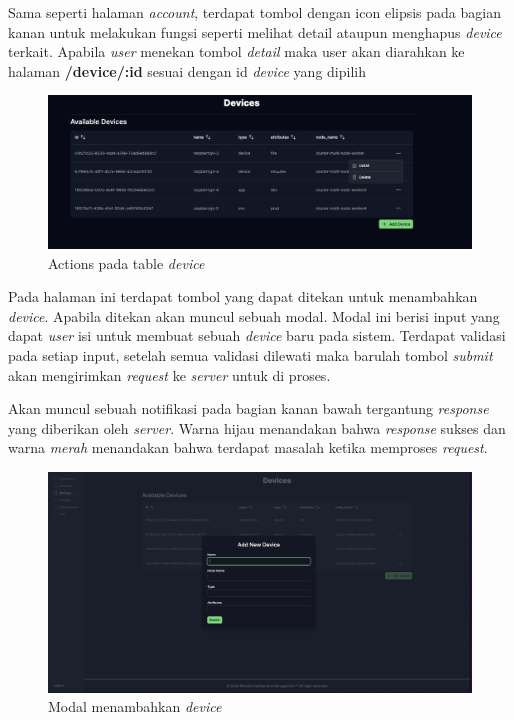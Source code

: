 Sama seperti halaman \textit{account}, terdapat tombol dengan icon elipsis pada bagian kanan untuk melakukan fungsi seperti melihat detail ataupun menghapus \textit{device} terkait. Apabila \textit{user} menekan tombol \textit{detail} maka user akan diarahkan ke halaman \textbf{/device/:id} sesuai dengan id \textit{device} yang dipilih

\begin{figure}[h]
  \centering
  \includegraphics[width=1\textwidth]{resources/chapter-4/dashboard/device-page-actions.jpg}
  \caption{Actions pada table \textit{device}}
  \label{fig:halaman-device-actions}
\end{figure}

Pada halaman ini terdapat tombol yang dapat ditekan untuk menambahkan \textit{device}. Apabila ditekan akan muncul sebuah modal. Modal ini berisi input yang dapat \textit{user} isi untuk membuat sebuah \textit{device} baru pada sistem. Terdapat validasi pada setiap input, setelah semua validasi dilewati maka barulah tombol \textit{submit} akan mengirimkan \textit{request} ke \textit{server} untuk di proses.

Akan muncul sebuah notifikasi pada bagian kanan bawah tergantung \textit{response} yang diberikan oleh \textit{server}. Warna hijau menandakan bahwa \textit{response} sukses dan warna \textit{merah} menandakan bahwa terdapat masalah ketika memproses \textit{request}.

\begin{figure}[h]
  \centering
  \includegraphics[width=1\textwidth]{resources/chapter-4/dashboard/device-page-add.jpg}
  \caption{Modal menambahkan \textit{device}}
  \label{fig:halaman-device-add}
\end{figure}



